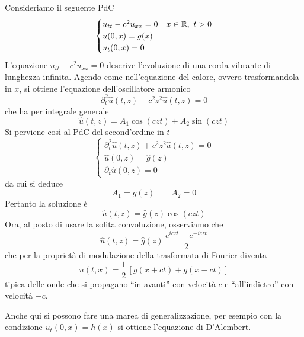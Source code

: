 Consideriamo il seguente PdC
\begin{equation*}
\begin{cases}
u_{tt}-c^2u_{xx}=0 &x\in\mathbb{R},\ t>0 \\
u(0,x)=g(x)\\
u_t(0,x)=0
\end{cases}
\end{equation*}
L'equazione $u_{tt}-c^2u_{xx}=0$ descrive l'evoluzione di una corda vibrante di lunghezza infinita. Agendo come nell'equazione del calore, ovvero trasformandola in $x$, si ottiene l'equazione dell'oscillatore armonico
\begin{equation*}
\partial^2_t\hat{u}(t,z)+c^2z^2\hat{u}(t,z)=0
\end{equation*}
che ha per integrale generale
\begin{equation*}
\hat{u}(t,z)=A_1\cos(czt)+A_2\sin(czt)
\end{equation*}
Si perviene così al PdC del second'ordine in $t$
\begin{equation*}
\begin{cases}
\partial^2_t\hat{u}(t,z)+c^2z^2\hat{u}(t,z)=0 \\
\hat{u}(0,z)=\hat{g}(z)\\
\partial_t\hat{u}(0,z)=0
\end{cases}
\end{equation*}
da cui si deduce
\begin{equation*}
A_1=\hat{g}(z)\qquad A_2=0
\end{equation*}
Pertanto la soluzione è
\begin{equation*}
\hat{u}(t,z)=\hat{g}(z)\cos(czt)
\end{equation*}
Ora, al posto di usare la solita convoluzione, osserviamo che
\begin{equation*}
\hat{u}(t,z)=\hat{g}(z)\,\frac{e^{iczt}+e^{-iczt}}{2}
\end{equation*}
che per la proprietà di modulazione della trasformata di Fourier diventa
\begin{equation*}
u(t,x)=\frac{1}{2}\,\left[g(x+ct)+g(x-ct)\right]
\end{equation*}
tipica delle onde che si propagano ``in avanti'' con velocità $c$ e ``all'indietro'' con velocità $-c$.

\begin{rem}
Anche qui si possono fare una marea di generalizzazione, per esempio con la condizione $u_t(0,x)=h(x)$ si ottiene l'equazione di D'Alembert.
\end{rem}


